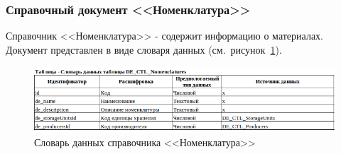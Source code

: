 
\newpage

\subsubsection{Справочный документ <<Номенклатура>>}

Справочник <<Номенклатура>> - содержит информацию о материалах.
Документ представлен в виде словаря данных (см.~рисунок~\ref{fig:InformationalModel_DE_CTL_Nomenclatures}).

\begin{figure}[!h]
    \centering
    \includegraphics[width=16cm]
    {assets/InformationalModel/DE_CTL_Nomenclatures.png}
    \caption{Словарь данных справочника <<Номенклатура>>}
    \label{fig:InformationalModel_DE_CTL_Nomenclatures}
\end{figure}







